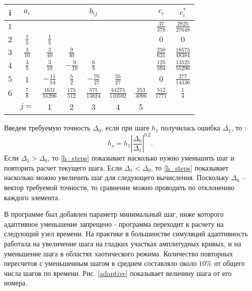 \begin{tabular}{||c|c|c|c|c|c|c|c|c||}
\hline
i & $a_i$ & & & $b_{ij}$ & & & $c_i$ & $c_i^*$\\
\hline
$1$ & & & & & & & $\frac{37}{378}$ & $\frac{2825}{27648}$\\
\hline
$2$ & $\frac{1}{5}$ & $\frac{1}{5}$ & & & & & $0$ & $0$\\
\hline
$3$ & $\frac{3}{10}$ & $\frac{3}{40}$ & $\frac{9}{40}$ & & & & $\frac{250}{621}$ & $\frac{18575}{48384}$\\
\hline
$4$ & $\frac{3}{5}$ & $\frac{3}{10}$ & $-\frac{9}{10}$ & $\frac{6}{5}$ & & & $\frac{125}{594}$ & $\frac{13525}{55296}$\\
\hline
$5$ & 1 & $-\frac{11}{54}$ & $\frac{5}{2}$ & $-\frac{70}{27}$ & $\frac{35}{27}$ & & $0$ & $\frac{277}{14336}$\\
\hline
$6$ & $\frac{7}{8}$ & $\frac{1631}{55296}$ & $\frac{175}{512}$ & $\frac{575}{13824}$ & $\frac{44275}{110592}$ & $\frac{253}{4096}$ & $\frac{512}{1771}$ & $\frac{1}{4}$\\
\hline
& $j=$ & 1 & 2 & 3 & 4 & 5 & & \\
\hline
\end{tabular}

Введем требуемую точность $\Delta_0$, если при шаге $h_1$ получилась ошибка $\Delta_1$, то  \cite{Numercial_recipes}:
\begin{equation}\label{h_steps}
h_o=h_1\left|\frac{\Delta_0}{\Delta_1}\right|^{0.2}.
\end{equation}
Если $\Delta_1 > \Delta_0$, то \eqref{h_steps} показывает насколько нужно уменьшить шаг и повторить расчет текущего шага. Если $\Delta_1 < \Delta_0$, то \eqref{h_steps} показывает насколько можно увеличить шаг для следующего вычисления. Поскольку $\Delta_0$ -- вектор требуемой точности, то сравнение можно проводить по отклонению каждого элемента.


В программе был добавлен параметр минимальный шаг, ниже которого адаптивное уменьшение запрещено - программа переходит к расчету на следующий узел времени. На практике в большинстве симуляций адаптивность работала на увеличение шага на гладких участках амплитудных кривых, и на уменьшение шага в областях хаотического режима. Количество повторных пересчетов с уменьшенным шагом в среднем составляло около $10\%$ от общего числа шагов по времени. Рис. \ref{adaptive} показывает величину шага от его номера.

